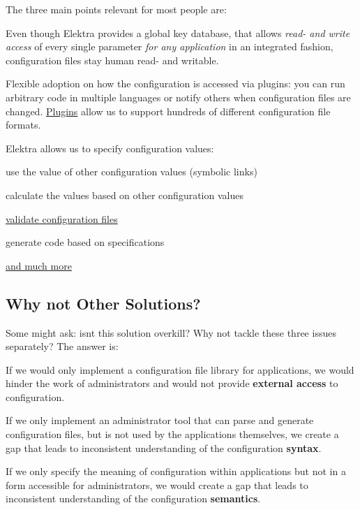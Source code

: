 The three main points relevant for most people are\+:


\begin{DoxyEnumerate}
\item Even though Elektra provides a global key database, that allows {\itshape read-\/ and write access} of every single parameter {\itshape for any application} in an integrated fashion, configuration files stay human read-\/ and writable.
\item Flexible adoption on how the configuration is accessed via plugins\+: you can run arbitrary code in multiple languages or notify others when configuration files are changed. \hyperlink{src_plugins_README_md}{Plugins} allow us to support hundreds of different configuration file formats.
\item Elektra allows us to specify configuration values\+:
\begin{DoxyItemize}
\item use the value of other configuration values (symbolic links)
\item calculate the values based on other configuration values
\item \hyperlink{md_doc_tutorials_validation_doc_tutorials_validation_md}{validate configuration files}
\item generate code based on specifications
\item \hyperlink{src_plugins_README_md}{and much more}
\end{DoxyItemize}
\end{DoxyEnumerate}

\subsection*{Why not Other Solutions?}

Some might ask\+: isn\textquotesingle{}t this solution overkill? Why not tackle these three issues separately? The answer is\+:


\begin{DoxyEnumerate}
\item If we would only implement a configuration file library for applications, we would hinder the work of administrators and would not provide {\bfseries external access} to configuration.
\item If we only implement an administrator tool that can parse and generate configuration files, but is not used by the applications themselves, we create a gap that leads to inconsistent understanding of the configuration {\bfseries syntax}.
\item If we only specify the meaning of configuration within applications but not in a form accessible for administrators, we would create a gap that leads to inconsistent understanding of the configuration {\bfseries semantics}.
\end{DoxyEnumerate}


